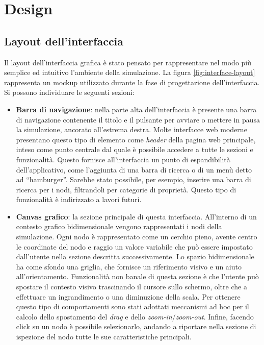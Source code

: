 \chapter{Design}
\section{Layout dell'interfaccia} \label{section:interface-layout}
Il layout dell'interfaccia grafica è stato pensato per rappresentare nel modo più semplice ed intuitivo l'ambiente della simulazione.  La figura \ref{fig:interface-layout} rappresenta un mockup utilizzato durante la fase di progettazione dell'interfaccia. Si possono individuare le seguenti sezioni:
\begin{itemize}
	\item \textbf{Barra di navigazione}: nella parte alta dell'interfaccia è presente una barra di navigazione contenente il titolo e il pulsante per avviare o mettere in pausa la simulazione, ancorato all'estrema destra. Molte interfacce web moderne presentano questo tipo di elemento come \textit{header} della pagina web principale, inteso come punto centrale dal quale è possibile accedere a tutte le sezioni e funzionalità. Questo fornisce all'interfaccia un punto di espandibilità dell'applicativo, come l'aggiunta di una barra di ricerca o di un menù detto ad ``hamburger''. Sarebbe stato possibile, per esempio, inserire una barra di ricerca per i nodi, filtrandoli per categorie di proprietà. Questo tipo di funzionalità è indirizzato a lavori futuri. 
	\item \textbf{Canvas grafico}: la sezione principale di questa interfaccia. All'interno di un contesto grafico bidimensionale vengono rappresentati i nodi della simulazione. Ogni nodo è rappresentato come un cerchio pieno, avente centro le coordinate del nodo e raggio un valore variabile che può essere impostato dall'utente nella sezione descritta successivamente. Lo spazio bidimensionale ha come sfondo una griglia, che  fornisce un riferimento visivo e un aiuto all'orientamento. Funzionalità non banale di questa sezione è che l'utente può spostare il contesto visivo trascinando il cursore sullo schermo, oltre che a effettuare un ingrandimento o una diminuzione della scala. Per ottenere questo tipo di comportamenti sono stati adottati meccanismi ad hoc per il calcolo dello spostamento del \textit{drag} e dello \textit{zoom-in}/\textit{zoom-out}. Infine, facendo click su un nodo è possibile selezionarlo, andando a riportare nella sezione di ispezione del nodo tutte le sue caratteristiche principali.

\end{itemize}

